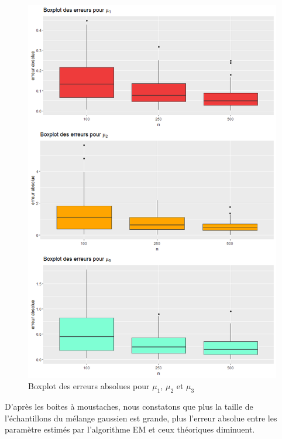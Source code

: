 \documentclass[frenchb]{report}
\newcommand{\1}{\mathbbm{1}}
\theoremstyle{definition}\newtheorem{defn}{Définition}
\theoremstyle{definition}\newtheorem{exm}{Exemple}
\theoremstyle{definition}\newtheorem{nota}{Notation}
\theoremstyle{definition}\newtheorem{rem}{Remarque}
\begin{document}
\begin{figure}[H]
	\centering
	\includegraphics[scale=0.5]{images/good_mu.png}
	\caption{Boxplot des erreurs absolues pour $\mu_1$, $\mu_2$ et $\mu_3$}
\end{figure}
D'après les boites à moustaches, nous constatons que plus la taille de l'échantillons du mélange gaussien est grande, plus l'erreur absolue entre les paramètre estimés par l'algorithme EM et ceux théoriques diminuent.
\end{document}
